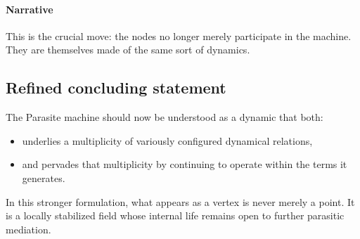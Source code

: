 \documentclass[11pt]{article}
\begin{document}
\paragraph{Narrative}
This is the crucial move:
the nodes no longer merely participate in the machine.
They are themselves made of the same sort of dynamics.

\subsection*{Refined concluding statement}

The Parasite machine should now be understood as a dynamic that both:
\begin{itemize}
\item underlies a multiplicity of variously configured dynamical relations,
\item and pervades that multiplicity by continuing to operate within the terms it generates.
\end{itemize}

In this stronger formulation, what appears as a vertex is never merely a point.
It is a locally stabilized field whose internal life remains open to further parasitic mediation.
\end{document}
